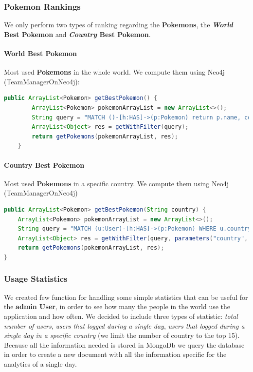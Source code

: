 \subsubsection{Pokemon Rankings}
We only perform two types of ranking regarding the \textbf{Pokemons}, the \textbf{\textit{World} Best Pokemon} and \textbf{\textit{Country} Best Pokemon}.

\paragraph{World Best Pokemon}
Most used \textbf{Pokemons} in the whole world. We compute them using Neo4j (TeamManagerOnNeo4j):

\begin{lstlisting}[language=Java]
	public ArrayList<Pokemon> getBestPokemon() {
		ArrayList<Pokemon> pokemonArrayList = new ArrayList<>();
		String query = "MATCH ()-[h:HAS]->(p:Pokemon) return p.name, count(h) AS held, p.sprite ORDER BY held DESC LIMIT " +  + ConfigDataHandler.getInstance().configData.numRowsRanking;
		ArrayList<Object> res = getWithFilter(query);
		return getPokemons(pokemonArrayList, res);
	}
\end{lstlisting}

\paragraph{Country Best Pokemon}
Most used \textbf{Pokemons} in a specific country. We compute them using Neo4j (TeamManagerOnNeo4j)

\begin{lstlisting}[language=Java]
public ArrayList<Pokemon> getBestPokemon(String country) {
	ArrayList<Pokemon> pokemonArrayList = new ArrayList<>();
	String query = "MATCH (u:User)-[h:HAS]->(p:Pokemon) WHERE u.country = $country return p.name, count(h) AS held, p.sprite ORDER BY held DESC LIMIT " + ConfigDataHandler.getInstance().configData.numRowsRanking;
	ArrayList<Object> res = getWithFilter(query, parameters("country", country));
	return getPokemons(pokemonArrayList, res);
}
\end{lstlisting}

\subsubsection{Usage Statistics}
We created few function for handling some simple statistics that can be useful for the \textbf{admin User}, in order to see how many the people in the world use the application and how often. We decided to include three types of statistic: \textit{total number of users}, \textit{users that logged during a single day}, \textit{users that logged during a single day in a specific country} (we limit the number of country to the top 15). Because all the information needed is stored in MongoDb we query the database in order to create a new document with all the information specific for the analytics of a single day.

